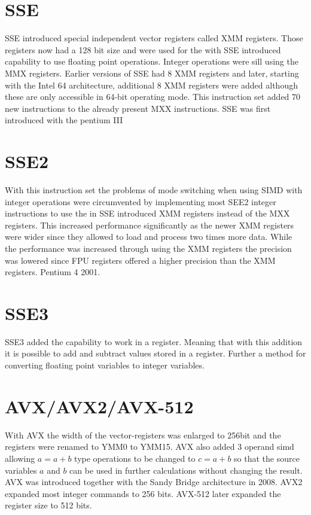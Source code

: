 \documentclass[
	12pt,
	a4paper,
	BCOR10mm,
	DIV14,
	headsepline,
	usegeometry,
]{scrreprt}
\begin{document}
    \section{SSE}
    SSE introduced special independent vector registers called
    XMM registers. Those registers now had a 128 bit size and were used for the with SSE introduced
    capability to use floating point operations. Integer operations were sill using the MMX
    registers. Earlier versions of SSE had 8 XMM registers and later, starting with the Intel
    64 architecture, additional 8 XMM registers were added although these are only accessible in
    64-bit operating mode. 
    This instruction set added 70 new instructions to the already present MXX instructions.
    SSE was first introduced with the pentium III 
    \section{SSE2}
    With this instruction set the problems of mode switching when using SIMD with integer
    operations were circumvented by implementing most SEE2 integer instructions to use the in SSE
    introduced XMM registers instead of the MXX registers. This increased performance significantly
    as the newer XMM registers were wider since they allowed to load and process two times more data.
    While the performance was increased through using the XMM registers the precision was lowered
    since FPU registers offered a higher precision than the XMM registers.
    Pentium 4 2001.
    \section{SSE3}
    SSE3 added the capability to work in a register. Meaning that with this addition it is possible
    to add and subtract values stored in a register. Further a method for converting floating point
    variables to integer variables.
    \section{AVX/AVX2/AVX-512}
    With AVX the width of the vector-registers was enlarged to 256bit and the registers were
    renamed to YMM0 to YMM15. AVX also added 3 operand simd allowing ${a = a + b}$ type operations to
    be changed to ${c = a + b}$ so that the source variables $a$ and $b$ can be used in further
    calculations without changing the result. AVX was introduced together with the Sandy Bridge
    architecture in 2008.\newline
    AVX2 expanded most integer commands to 256 bits.\newline
    AVX-512 later expanded the register size to 512 bits.\cite{AVX-AVX2-AVX512}
\end{document}
